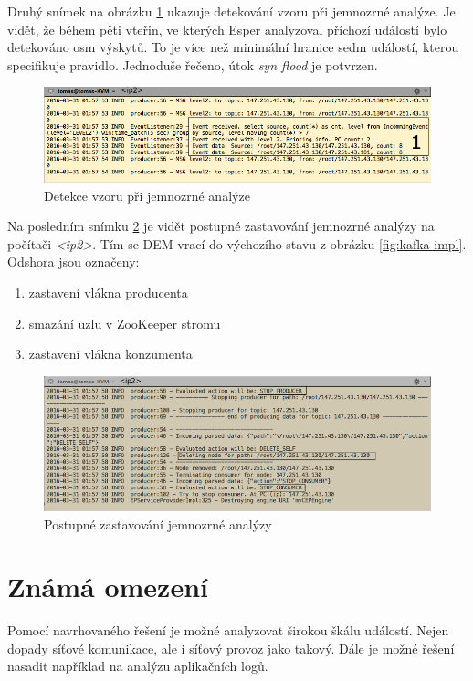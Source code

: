 \documentclass[
  digital, %
  table,   %
  nolof,     %
  nolot,     %
  oneside, %
  nocover,
  monochrome,
  12pt
]{fithesis3}
\begin{document}
Druhý snímek na obrázku \ref{fig:match-pattern-screen} ukazuje detekování vzoru při jemnozrné analýze. Je vidět, že během pěti vteřin, ve kterých Esper analyzoval příchozí událostí bylo detekováno osm výskytů. To je více než minimální hranice sedm událostí, kterou specifikuje pravidlo. Jednoduše řečeno, útok \textit{syn flood} je potvrzen.

\begin{figure}[H]
	\centering
    \includegraphics[width=.9\linewidth, height=.15\textheight]{images/match-pattern-screen.png}
    \caption{Detekce vzoru při jemnozrné analýze}
    \label{fig:match-pattern-screen}
\end{figure}

Na posledním snímku \ref{fig:clean-up-screen} je vidět postupné zastavování jemnozrné analýzy na počítači \textit{<ip2>}. Tím se DEM vrací do výchozího stavu z obrázku \ref{fig:kafka-impl}. Odshora jsou označeny:

\begin{enumerate}
  \item zastavení vlákna producenta
  \item smazání uzlu v ZooKeeper stromu
  \item zastavení vlákna konzumenta
\end{enumerate}

\begin{figure}[H]
	\centering
    \includegraphics[width=.8\linewidth, height=.15\textheight]{images/clean-up-screen.png}
    \caption{Postupné zastavování jemnozrné analýzy}
    \label{fig:clean-up-screen}
\end{figure}

\section{Známá omezení}
Pomocí navrhovaného řešení je možné analyzovat širokou škálu událostí. Nejen dopady síťové komunikace, ale i síťový provoz jako takový. Dále je možné řešení nasadit například na analýzu aplikačních logů.
\end{document}
